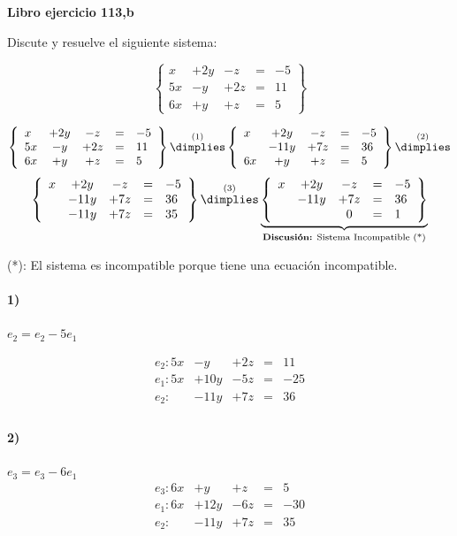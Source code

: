 \documentclass[palatino,nosec,nochap]{Docencia}
\begin{document}
\newpage
\begin{problem}
\textbf{Libro ejercicio 113,b}

Discute y resuelve el siguiente sistema:

\[
\left\{\begin{array}{lcccl}
x&+2y&-z&=&-5\\
5x&-y&+2z&=&11\\
6x&+y&+z&=&5
\end{array}\right\}
\]

\solution

\[
\left\{\begin{array}{lcccl}
x&+2y&-z&=&-5\\
5x&-y&+2z&=&11\\
6x&+y&+z&=&5
\end{array}\right\}
\overset{(1)}{\dimplies}
\left\{\begin{array}{lcccl}
x&+2y&-z&=&-5\\
&-11y&+7z&=&36\\
6x&+y&+z&=&5
\end{array}\right\}
\overset{(2)}{\dimplies}\]
\[
\left\{\begin{array}{lcccl}
x&+2y&-z&=&-5\\
&-11y&+7z&=&36\\
& -11y&+7z&=&35
\end{array}\right\}
\overset{(3)}{\dimplies}
\underbrace{\left\{\begin{array}{lcccl}
x&+2y&-z&=&-5\\
&-11y&+7z&=&36\\
& &0&=&1
\end{array}\right\}}_{\text{\textbf{Discusión:} Sistema Incompatible (*)}}
\]

(*): El sistema es incompatible porque tiene una ecuación incompatible.


\paragraph{1)} $e_2 = e_2-5e_1$

\[
\begin{array}{lcccl}
e_2: 5x&-y&+2z&=&11\\
e_1: 5x&+10y&-5z&=&-25\\
\hline
e_2:   & -11y&+7z&=&36\\
\end{array}
\]	

\paragraph*{2)} $e_3 = e_3-6e_1$
\[
\begin{array}{lcccl}
e_3: 6x&+y&+z&=&5\\
e_1: 6x&+12y&-6z&=&-30\\
\hline
e_2:   & -11y&+7z&=&35\\
\end{array}
\]	


\end{problem}
\end{document}
